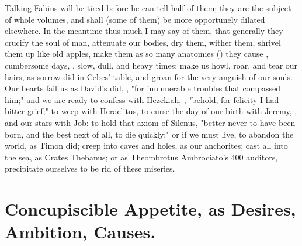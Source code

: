 
Talking Fabius will be tired before he can tell half of them; they are the
subject of whole volumes, and shall (some of them) be more opportunely dilated
elsewhere. In the meantime thus much I may say of them, that generally they
crucify the soul of man, attenuate our bodies, dry them,
wither them, shrivel them up like old apples, make them as so many anatomies
() they
cause , cumbersome days, , slow, dull, and heavy times: make us howl, roar, and tear our hairs,
as sorrow did in Cebes' table, and groan for the very
anguish of our souls. Our hearts fail us as David's did, , "for innumerable troubles that compassed him;" and we are ready
to confess with Hezekiah, , "behold, for
felicity I had bitter grief;" to weep with Heraclitus, to curse the day of our
birth with Jeremy, , and our stars with Job: to hold that axiom
of Silenus, "better never to have been born, and the best
next of all, to die quickly:" or if we must live, to abandon the world, as
Timon did; creep into caves and holes, as our anchorites; cast all into the
sea, as Crates Thebanus; or as Theombrotus Ambrociato's 400 auditors,
precipitate ourselves to be rid of these miseries.

\section{Concupiscible Appetite, as Desires, Ambition, Causes.}

